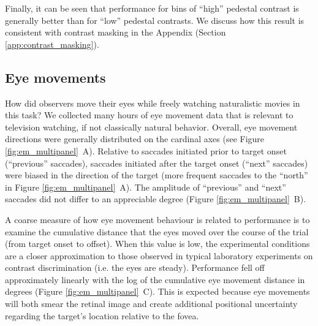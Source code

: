 \documentclass[11pt,a4paper]{article}
\begin{document}
Finally, it can be seen that performance for bins of ``high'' pedestal contrast is generally better than for ``low'' pedestal contrasts.
We discuss how this result is consistent with contrast masking in the Appendix (Section \ref{app:contrast_masking}).



\subsection{Eye movements}
\label{sec:eye_movements}

How did observers move their eyes while freely watching naturalistic movies in this task?
We collected many hours of eye movement data that is relevant to television watching, if not classically natural behavior. Overall, eye movement directions were generally distributed on the cardinal axes (see Figure \ref{fig:em_multipanel}~A).
Relative to saccades initiated prior to target onset (``previous'' saccades), saccades initiated after the target onset (``next'' saccades) were biased in the direction of the target (more frequent saccades to the ``north'' in Figure \ref{fig:em_multipanel}~A).
The amplitude of ``previous'' and ``next'' saccades did not differ to an appreciable degree (Figure \ref{fig:em_multipanel}~B).

A coarse measure of how eye movement behaviour is related to performance is to examine the cumulative distance that the eyes moved over the course of the trial (from target onset to offset).
When this value is low, the experimental conditions are a closer approximation to those observed in typical laboratory experiments on contrast discrimination (i.e. the eyes are steady).
Performance fell off approximately linearly with the log of the cumulative eye movement distance in degrees (Figure \ref{fig:em_multipanel}~C).
This is expected because eye movements will both smear the retinal image and create additional positional uncertainty regarding the target's location relative to the fovea.
\end{document}
